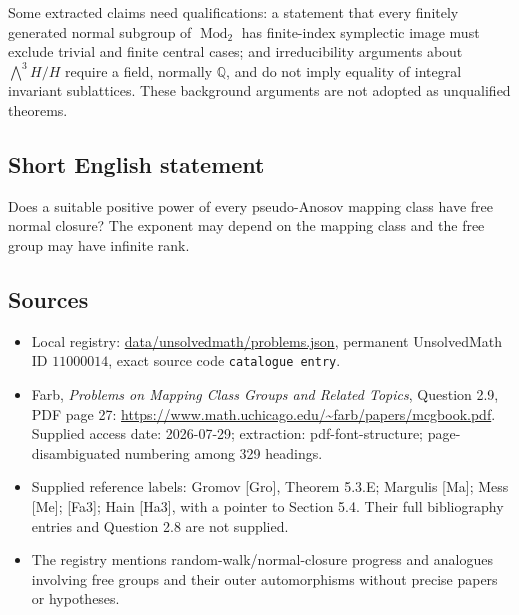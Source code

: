 \documentclass[11pt]{article}
\newcommand{\Q}{\mathbb{Q}}
\begin{document}
Some extracted claims need qualifications: a statement that every finitely generated normal subgroup of $\operatorname{Mod}_2$ has finite-index symplectic image must exclude trivial and finite central cases; and irreducibility arguments about $\bigwedge^3H/H$ require a field, normally $\Q$, and do not imply equality of integral invariant sublattices. These background arguments are not adopted as unqualified theorems.
\subsection{Short English statement}
Does a suitable positive power of every pseudo-Anosov mapping class have free normal closure? The exponent may depend on the mapping class and the free group may have infinite rank.
\subsection{Sources}
\begin{itemize}
\item Local registry: \url{data/unsolvedmath/problems.json}, permanent UnsolvedMath ID $11000014$, exact source code \texttt{catalogue entry}.
\item Farb, \emph{Problems on Mapping Class Groups and Related Topics}, Question 2.9, PDF page 27: \url{https://www.math.uchicago.edu/~farb/papers/mcgbook.pdf}. Supplied access date: 2026-07-29; extraction: pdf-font-structure; page-disambiguated numbering among 329 headings.
\item Supplied reference labels: Gromov [Gro], Theorem 5.3.E; Margulis [Ma]; Mess [Me]; [Fa3]; Hain [Ha3], with a pointer to Section 5.4. Their full bibliography entries and Question 2.8 are not supplied.
\item The registry mentions random-walk/normal-closure progress and analogues involving free groups and their outer automorphisms without precise papers or hypotheses.
\end{itemize}
\end{document}
